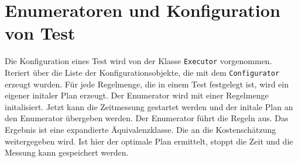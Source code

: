 \section{Enumeratoren und Konfiguration von Test}

Die Konfiguration eines Test wird von der Klasse \texttt{Executor} vorgenommen. Iteriert über die Liste der Konfigurationsobjekte, die mit dem \texttt{Configurator} erzeugt wurden. Für jede Regelmenge, die in einem Test festgelegt ist, wird ein eigener initaler Plan erzeugt. Der Enumerator wird mit einer Regelmenge initalisiert. Jetzt kann die Zeitmessung gestartet werden und der initale Plan an den Enumerator übergeben werden. Der Enumerator führt die Regeln aus. Das Ergebnis ist eine expandierte Äquivalenzklasse. Die an die Kostenschätzung weitergegeben wird. Ist hier der optimale Plan ermittelt, stoppt die Zeit und die Messung kann gespeichert werden.


